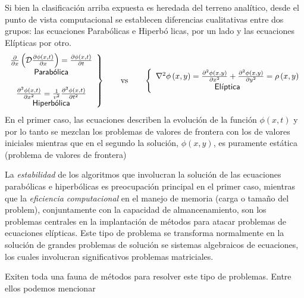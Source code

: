 \documentclass[spanish,titlepage,11pt]{article}
\begin{document}
Si bien la clasificaci\'{o}n arriba expuesta es heredada del terreno
anal\'{i}tico, desde el punto de vista computacional se establecen diferencias
cualitativas entre dos grupos: las ecuaciones Parab\'{o}licas e Hiperb\'{o}%
licas, por un lado y las ecuaciones El\'{i}pticas por otro.
\[
\left.
\begin{array}
[c]{c}%
\frac{\partial}{\partial x}\left(  \mathcal{D}\frac{\partial\phi\left(
x,t\right)  }{\partial x}\right)  =\frac{\partial\phi\left(  x,t\right)
}{\partial t}\\
\mathsf{Parab\acute{o}lica}\\
\\
\frac{\partial^{2}\phi\left(  x,t\right)  }{\partial x^{2}}=\frac{1}{v^{2}%
}\frac{\partial^{2}\phi\left(  x,t\right)  }{\partial t^{2}}\\
\mathsf{Hiperb\acute{o}lica}%
\end{array}
\right\}  \qquad\mathrm{vs\qquad}\left\{
\begin{array}
[c]{c}%
\nabla^{2}\phi\left(  x,y\right)  =\frac{\partial^{2}\phi\left(  x,y\right)
}{\partial x^{2}}+\frac{\partial^{2}\phi\left(  x,y\right)  }{\partial y^{2}%
}=\rho\left(  x,y\right) \\
\mathsf{El\acute{\imath}ptica}%
\end{array}
\right.
\]
En el primer caso, las ecuaciones describen la evoluci\'{o}n de la funci\'{o}n
$\phi\left(  x,t\right)  $ y por lo tanto se mezclan los problemas de valores
de frontera con los de valores iniciales mientras que en el segundo la
soluci\'{o}n, $\phi\left(  x,y\right)  $, es puramente est\'{a}tica (problema
de valores de frontera)

La \textit{estabilidad} de los algoritmos que involucran la soluci\'{o}n de
las ecuaciones parab\'{o}licas e hiperb\'{o}licas es preocupaci\'{o}n
principal en el primer caso, mientras que la \textit{eficiencia computacional}
en el manejo de memoria (carga o tama\~{n}o del problem), conjuntamente con la
capacidad de almancenamiento, son los problemas centrales en la
implantaci\'{o}n de m\'{e}todos para atacar problemas de ecuaciones
el\'{i}pticas. Este tipo de problema se transforma normalmente en la
soluci\'{o}n de grandes problemas de soluci\'{o}n se sistemas algebraicos de
ecuaciones, los cuales involucran significativos problemas matriciales.

Exiten toda una fauna de m\'{e}todos para resolver este tipo de problemas.
Entre ellos podemos mencionar
\end{document}
